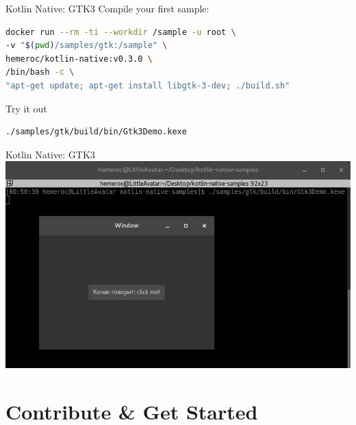 \begin{frame}[fragile]{Kotlin Native: GTK3}
	Compile your first sample:\\
	\begin{lstlisting}[language=bash,basicstyle=\ttfamily\small]
docker run --rm -ti --workdir /sample -u root \
-v "$(pwd)/samples/gtk:/sample" \
hemeroc/kotlin-native:v0.3.0 \
/bin/bash -c \
"apt-get update; apt-get install libgtk-3-dev; ./build.sh"
	\end{lstlisting}
	Try it out\\
	\begin{lstlisting}[language=bash,basicstyle=\ttfamily\small]
./samples/gtk/build/bin/Gtk3Demo.kexe
	\end{lstlisting}
\end{frame}

\begin{frame}[fragile]{Kotlin Native: GTK3}
	\includegraphics[width=0.85\paperwidth]{figures/gtk3}
\end{frame}

\section{Contribute \& Get Started}

